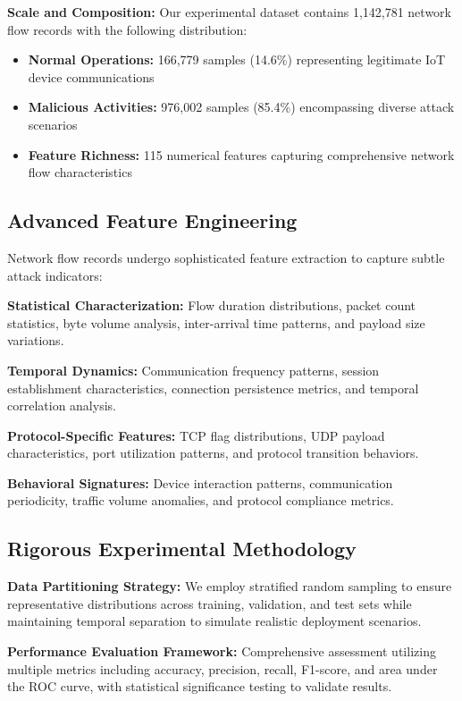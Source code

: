 \documentclass[conference]{IEEEtran}
\begin{document}
\textbf{Scale and Composition:}
Our experimental dataset contains 1,142,781 network flow records with the following distribution:
\begin{itemize}
\item \textbf{Normal Operations:} 166,779 samples (14.6\%) representing legitimate IoT device communications
\item \textbf{Malicious Activities:} 976,002 samples (85.4\%) encompassing diverse attack scenarios
\item \textbf{Feature Richness:} 115 numerical features capturing comprehensive network flow characteristics
\end{itemize}

\subsection{Advanced Feature Engineering}

Network flow records undergo sophisticated feature extraction to capture subtle attack indicators:

\textbf{Statistical Characterization:} Flow duration distributions, packet count statistics, byte volume analysis, inter-arrival time patterns, and payload size variations.

\textbf{Temporal Dynamics:} Communication frequency patterns, session establishment characteristics, connection persistence metrics, and temporal correlation analysis.

\textbf{Protocol-Specific Features:} TCP flag distributions, UDP payload characteristics, port utilization patterns, and protocol transition behaviors.

\textbf{Behavioral Signatures:} Device interaction patterns, communication periodicity, traffic volume anomalies, and protocol compliance metrics.

\subsection{Rigorous Experimental Methodology}

\textbf{Data Partitioning Strategy:}
We employ stratified random sampling to ensure representative distributions across training, validation, and test sets while maintaining temporal separation to simulate realistic deployment scenarios.

\textbf{Performance Evaluation Framework:}
Comprehensive assessment utilizing multiple metrics including accuracy, precision, recall, F1-score, and area under the ROC curve, with statistical significance testing to validate results.
\end{document}
